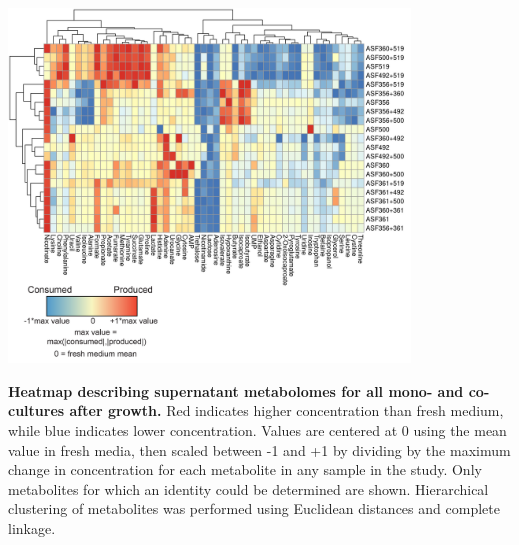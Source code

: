 \documentclass[11pt,twocolumn,notitlepage,openany,twoside]{book}
\begin{document}
\begin{refsection}
\begin{suppfigure*}
\centering
\includegraphics[width=0.8\textwidth]{ch2_figS1}
\caption[Heatmap describing supernatant metabolomes for all mono- and co-cultures after growth.]{\textbf{Heatmap describing supernatant metabolomes for all mono- and co-cultures after growth.} Red indicates higher concentration than fresh medium, while blue indicates lower concentration. Values are centered at 0 using the mean value in fresh media, then scaled between -1 and +1 by dividing by the maximum change in concentration for each metabolite in any sample in the study. Only metabolites for which an identity could be determined are shown. Hierarchical clustering of metabolites was performed using Euclidean distances and complete linkage.}
\end{suppfigure*}


\end{refsection}
\end{document}
